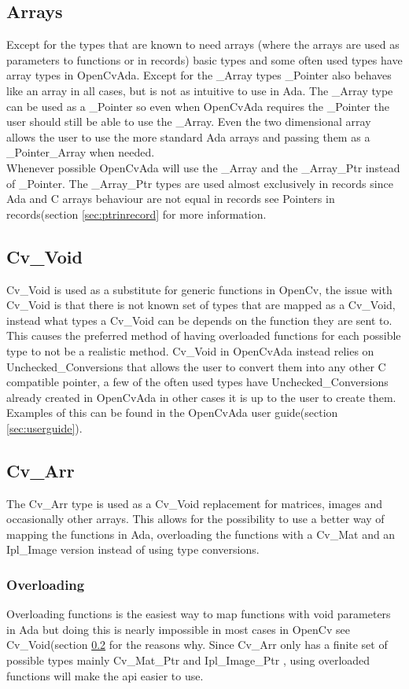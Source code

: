 \subsection{Arrays}\label{sec:array}
Except for the types that are known to need arrays (where the arrays are used as parameters to functions or in records) basic types and some often used types have array types in OpenCvAda. Except for the _Array types _Pointer also behaves like an array in all cases, but is not as intuitive to use in Ada. The _Array type can be used as a _Pointer so even when OpenCvAda requires the _Pointer the user should still be able to use the _Array. Even the two dimensional array allows the user to use the more standard Ada arrays and passing them as a _Pointer_Array when needed.  
\\
Whenever possible OpenCvAda will use the _Array and the _Array_Ptr instead of _Pointer. The _Array_Ptr types are used almost exclusively in records since Ada and C arrays behaviour are not equal in records see Pointers in records(section \ref{sec:ptrinrecord} for more information.
\subsection{Cv_Void}\label{sec:cvvoid}
Cv_Void is used as a substitute for generic functions in OpenCv, the issue with Cv_Void is that there is not known set of types that are mapped as a Cv_Void, instead what types a Cv_Void can be depends on the function they are sent to. This causes the preferred method of having overloaded functions for each possible type to not be a realistic method. Cv_Void in OpenCvAda instead relies on Unchecked_Conversions that allows the user to convert them into any other C compatible pointer, a few of the often used types have Unchecked_Conversions already created in OpenCvAda in other cases it is up to the user to create them. Examples of this can be found in the OpenCvAda user guide(section \ref{sec:userguide}).
\subsection{Cv_Arr}
The Cv_Arr type is used as a Cv_Void replacement for matrices, images and occasionally other arrays. This allows for the possibility to use a better way of mapping the functions in Ada, overloading the functions with a Cv_Mat and an Ipl_Image version instead of using type conversions.
\subsubsection{Overloading}
Overloading functions is the easiest way to map functions with void parameters in Ada but doing this is nearly impossible in most cases in OpenCv see Cv_Void(section \ref{sec:cvvoid} for the reasons why. Since Cv_Arr only has a finite set of possible types mainly Cv_Mat_Ptr and Ipl_Image_Ptr , using overloaded functions will make the api easier to use.
